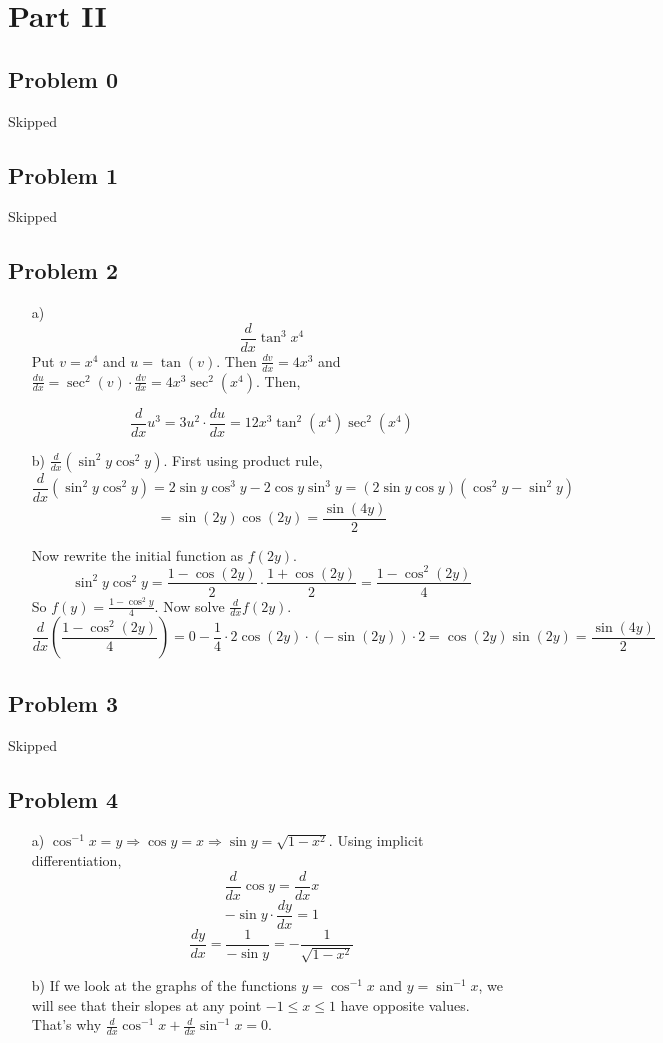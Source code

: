 \documentclass{article}
\begin{document}
\section{Part II}
\subsection{Problem 0}
Skipped
\subsection{Problem 1}
Skipped
\subsection{Problem 2}
\begin{itemize}
    \item[a)] 
    \[ \frac{d}{dx}{\tan^3{x^4}} \]
    Put $v = x^4$ and $u = \tan{(v)}$. Then $\frac{dv}{dx} = 4x^3$ and $\frac{du}{dx} = \sec^2{(v)} 
    \cdot \frac{dv}{dx} = 4x^3\sec^2{(x^4)}$. Then,

    \[ \frac{d}{dx} u^3 = 3u^2 \cdot \frac{du}{dx} = 12x^3 \tan^2{(x^4)} \sec^2{(x^4)}\]

    \item[b)] $\frac{d}{dx} \left( \sin^2{y} \cos^2{y} \right)$. First using product rule,
    \[ \frac{d}{dx} \left( \sin^2{y} \cos^2{y} \right) = 2\sin{y} \cos^3{y} - 2 \cos{y} \sin^3{y} = (2 \sin{y} \cos{y})(\cos^2{y}-\sin^2{y})\]
    \[ = \sin{(2y)} \cos{(2y)} = \frac{\sin{(4y)}}{2}\]

    Now rewrite the initial function as $f(2y)$. \[ \sin^2{y}\cos^2{y} = \frac{1 - \cos{(2y)}}{2} \cdot \frac{1 + \cos{(2y)}}{2} = \frac{1 - \cos^2{(2y)}}{4} \]
    So $f(y) = \frac{1 - \cos^2{y}}{4}$. Now solve $\frac{d}{dx}f(2y)$.
    \[ \frac{d}{dx} \left( \frac{1 - \cos^2{(2y)}}{4} \right) = 0 - \frac{1}{4} \cdot 2\cos{(2y)} \cdot (-\sin{(2y)})\cdot 2 = \cos{(2y)}\sin{(2y)} = \frac{\sin{(4y)}}{2}\]
    
\end{itemize}

\subsection{Problem 3}
Skipped

\subsection{Problem 4}
\begin{itemize}
    \item[a)] $\cos^{-1}x = y \Rightarrow \cos{y} = x \Rightarrow \sin{y} = \sqrt{1 - x^2}$. Using implicit differentiation, 
    \[ \frac{d}{dx} \cos{y} = \frac{d}{dx} x\]
    \[ -\sin{y} \cdot \frac{dy}{dx} = 1\]
    \[ \frac{dy}{dx} = \frac{1}{-\sin{y}} = -\frac{1}{\sqrt{1 - x^2}} \]

    \item[b)] If we look at the graphs of the functions $y = \cos^{-1}x$ and $y = \sin^{-1}x$, we will see that their slopes at any point $-1 \leq x \leq 1$ have opposite values. That's why $\frac{d}{dx} \cos^{-1}x + \frac{d}{dx} \sin^{-1}x = 0$.
\end{itemize}
\end{document}
